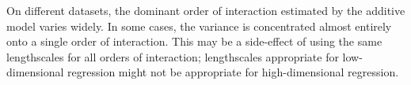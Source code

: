 On different datasets, the dominant order of interaction estimated by the additive model varies widely.
In some cases, the variance is concentrated almost entirely onto a single order of interaction.
This may be a side-effect of using the same lengthscales for all orders of interaction; lengthscales appropriate for low-dimensional regression might not be appropriate for high-dimensional regression.
%
%






